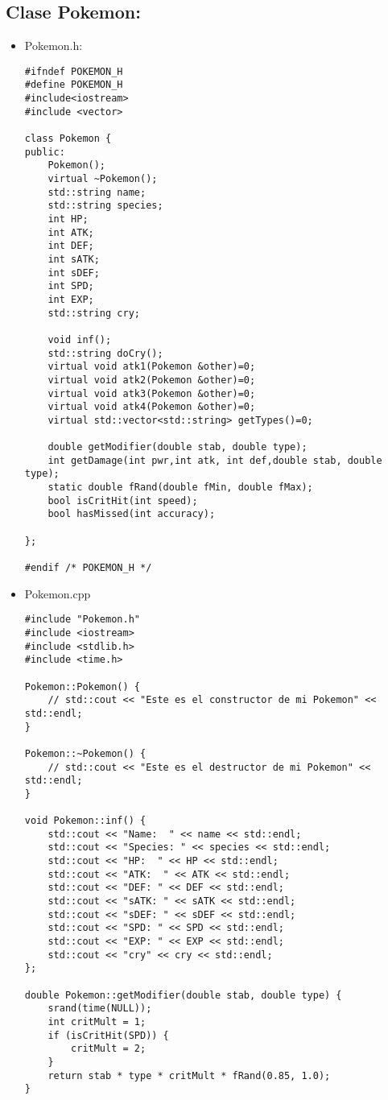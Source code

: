 \documentclass[11pt]{article}
\begin{document}
\subsection{ Clase Pokemon:}
\begin{itemize}
\item Pokemon.h:
\begin{lstlisting}
#ifndef POKEMON_H
#define POKEMON_H
#include<iostream>
#include <vector>

class Pokemon {
public:
    Pokemon();
    virtual ~Pokemon();
    std::string name;
    std::string species;
    int HP;
    int ATK;
    int DEF;
    int sATK;
    int sDEF;
    int SPD;
    int EXP;
    std::string cry;

    void inf();
    std::string doCry();
    virtual void atk1(Pokemon &other)=0;
    virtual void atk2(Pokemon &other)=0;
    virtual void atk3(Pokemon &other)=0;
    virtual void atk4(Pokemon &other)=0;
    virtual std::vector<std::string> getTypes()=0;

    double getModifier(double stab, double type);
    int getDamage(int pwr,int atk, int def,double stab, double type);
    static double fRand(double fMin, double fMax);
    bool isCritHit(int speed);
    bool hasMissed(int accuracy);

};

#endif /* POKEMON_H */

\end{lstlisting}
\item Pokemon.cpp
\begin{lstlisting}
#include "Pokemon.h"
#include <iostream>
#include <stdlib.h>
#include <time.h>

Pokemon::Pokemon() {
    // std::cout << "Este es el constructor de mi Pokemon" << std::endl;
}

Pokemon::~Pokemon() {
    // std::cout << "Este es el destructor de mi Pokemon" << std::endl;
}

void Pokemon::inf() {
    std::cout << "Name:  " << name << std::endl;
    std::cout << "Species: " << species << std::endl;
    std::cout << "HP:  " << HP << std::endl;
    std::cout << "ATK:  " << ATK << std::endl;
    std::cout << "DEF: " << DEF << std::endl;
    std::cout << "sATK: " << sATK << std::endl;
    std::cout << "sDEF: " << sDEF << std::endl;
    std::cout << "SPD: " << SPD << std::endl;
    std::cout << "EXP: " << EXP << std::endl;
    std::cout << "cry" << cry << std::endl;
};

double Pokemon::getModifier(double stab, double type) {
    srand(time(NULL));
    int critMult = 1;
    if (isCritHit(SPD)) {
        critMult = 2;
    }
    return stab * type * critMult * fRand(0.85, 1.0);
}


\end{lstlisting}
\end{itemize}
\end{document}
